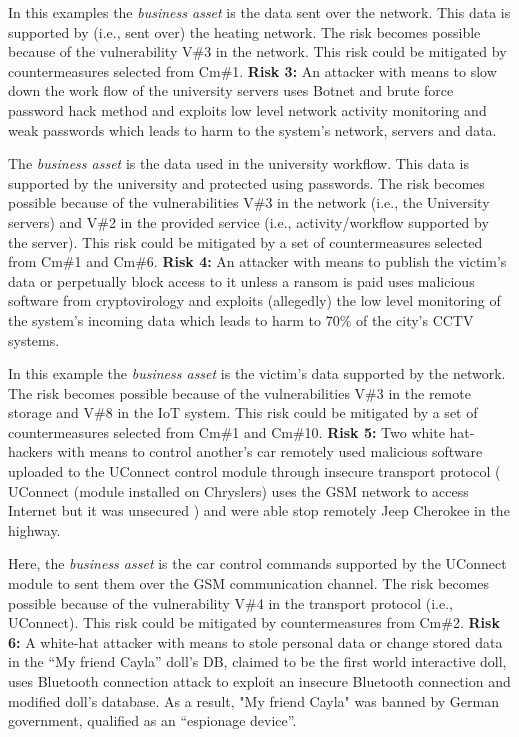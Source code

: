\documentclass[12pt]{article}
\begin{document}
	In this examples the \textit{business asset} is the data sent over the network. This data is supported by (i.e., sent over) the heating network. The risk becomes possible because of the vulnerability V\#3 in the network. This risk could be mitigated by countermeasures selected from Cm\#1.
	\vspace*{1ex}
	\newline\textbf{Risk 3:} An attacker with means to slow down the work flow of the university servers uses Botnet and brute force  password hack method and exploits low level network activity monitoring and weak passwords which leads to harm to the system's network, servers and data.
	
	The \textit{business asset} is the data used in the university workflow. This data is supported by the university and protected using passwords. The risk becomes possible because of the vulnerabilities V\#3 in the network (i.e., the University servers) and V\#2 in the provided service (i.e., activity/workflow supported by the server). This risk could be mitigated by a set of countermeasures selected from Cm\#1 and Cm\#6.
	\vspace*{1ex}
	\newline\textbf{Risk 4:} An attacker with means to publish the victim's data or perpetually block access to it unless a ransom is paid uses malicious software from cryptovirology and exploits (allegedly) the low level monitoring of the system's incoming data which leads to harm to 70\% of the city’s CCTV systems.
	
	In this example the \textit{business asset} is the victim’s data supported by the network. The risk becomes possible because of the vulnerabilities V\#3 in the remote storage and V\#8 in the IoT system. This risk could be mitigated by a set of countermeasures selected from Cm\#1 and Cm\#10.
	\vspace*{1ex}
	\newline\textbf{Risk 5:} Two white hat-hackers with means to control another’s car remotely used malicious software uploaded to the UConnect  control module through  insecure transport protocol ( UConnect (module installed on Chryslers) uses the GSM network to access Internet but it was unsecured ) and were able stop remotely Jeep Cherokee in the highway.
	
	Here, the \textit{business asset} is the car control commands supported by the UConnect module to sent them over the GSM communication channel. The risk becomes possible because of the vulnerability V\#4 in the transport protocol (i.e., UConnect). This risk could be mitigated by countermeasures from Cm\#2.
	\vspace*{1ex} 
	\newline \textbf{Risk 6:} A white-hat attacker with means to stole personal data or change stored data in the “My friend Cayla” doll's DB, claimed to be the first world interactive doll,  uses Bluetooth connection attack to exploit an insecure Bluetooth connection and modified doll's database. As a result, "My friend Cayla" was banned by German government, qualified as an “espionage device”.
	
\end{document}
